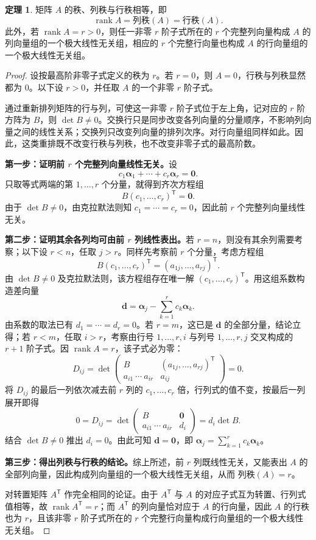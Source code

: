 \documentclass[UTF8, fontset=fandol, a4paper, 12pt]{ctexart}
\newcommand{\rank}{\operatorname{rank}}
\theoremstyle{definition}
\newtheorem{theorem}[definition]{定理}
\begin{document}
\begin{theorem}
矩阵 $A$ 的秩、列秩与行秩相等，即
\[
 \boxed{\rank A=\text{列秩}(A)=\text{行秩}(A).}
\]
此外，若 $\rank A=r>0$，则任一非零 $r$ 阶子式所在的 $r$ 个完整列向量构成 $A$ 的列向量组的一个极大线性无关组，相应的 $r$ 个完整行向量也构成 $A$ 的行向量组的一个极大线性无关组。
\end{theorem}
\begin{proof}
设按最高阶非零子式定义的秩为 $r$。若 $r=0$，则 $A=0$，行秩与列秩显然都为 $0$。以下设 $r>0$，并任取 $A$ 的一个非零 $r$ 阶子式。

通过重新排列矩阵的行与列，可使这一非零 $r$ 阶子式位于左上角，记对应的 $r$ 阶方阵为 $B$，则 $\det B\ne0$。交换行只是同步改变各列向量的分量顺序，不影响列向量之间的线性关系；交换列只改变列向量的排列次序。对行向量组同样如此。因此，这类重排既不改变行秩与列秩，也不改变非零子式的最高阶数。

\medskip
\textbf{第一步：证明前 $r$ 个完整列向量线性无关。}设
\[
 c_1\boldsymbol\alpha_1+\cdots+c_r\boldsymbol\alpha_r=\boldsymbol0.
\]
只取等式两端的第 $1,\ldots,r$ 个分量，就得到齐次方程组
\[
 B(c_1,\ldots,c_r)^{\mathsf T}=\boldsymbol0.
\]
由于 $\det B\ne0$，由克拉默法则知 $c_1=\cdots=c_r=0$，因此前 $r$ 个完整列向量线性无关。

\medskip
\textbf{第二步：证明其余各列均可由前 $r$ 列线性表出。}若 $r=n$，则没有其余列需要考察；以下设 $r<n$，任取 $j>r$。同样先考察前 $r$ 个分量，考虑方程组
\[
 B(c_1,\ldots,c_r)^{\mathsf T}=(a_{1j},\ldots,a_{rj})^{\mathsf T}.
\]
由 $\det B\ne0$ 及克拉默法则，该方程组存在唯一解 $(c_1,\ldots,c_r)^{\mathsf T}$。用这组系数构造差向量
\[
 \boldsymbol d=\boldsymbol\alpha_j-\sum_{k=1}^r c_k\boldsymbol\alpha_k.
\]
由系数的取法已有 $d_1=\cdots=d_r=0$。若 $r=m$，这已是 $\boldsymbol d$ 的全部分量，结论立得；若 $r<m$，任取 $i>r$，考察由行号 $1,\ldots,r,i$ 与列号 $1,\ldots,r,j$ 交叉构成的 $r+1$ 阶子式。因 $\rank A=r$，该子式必为零：
\[
 D_{ij}=\det\begin{pmatrix}
 B&(a_{1j},\ldots,a_{rj})^{\mathsf T}\\
 a_{i1}\ \cdots\ a_{ir}&a_{ij}
 \end{pmatrix}=0.
\]
将 $D_{ij}$ 的最后一列依次减去前 $r$ 列的 $c_1,\ldots,c_r$ 倍，行列式的值不变，按最后一列展开即得
\[
 0=D_{ij}
 =\det\begin{pmatrix}B&\boldsymbol0\\a_{i1}\ \cdots\ a_{ir}&d_i\end{pmatrix}
 =d_i\det B.
\]
结合 $\det B\ne0$ 推出 $d_i=0$。由此可知 $\boldsymbol d=\boldsymbol0$，即 $\boldsymbol\alpha_j=\sum_{k=1}^r c_k\boldsymbol\alpha_k$。

\medskip
\textbf{第三步：得出列秩与行秩的结论。}综上所述，前 $r$ 列既线性无关，又能表出 $A$ 的全部列向量，因此构成列向量组的一个极大线性无关组，从而 $\text{列秩}(A)=r$。

对转置矩阵 $A^{\mathsf T}$ 作完全相同的论证。由于 $A^{\mathsf T}$ 与 $A$ 的对应子式互为转置、行列式值相等，故 $\rank A^{\mathsf T}=r$；而 $A^{\mathsf T}$ 的列向量恰对应于 $A$ 的行向量，因此 $A$ 的行秩也为 $r$，且该非零 $r$ 阶子式所在的 $r$ 个完整行向量构成行向量组的一个极大线性无关组。
\end{proof}
\end{document}
